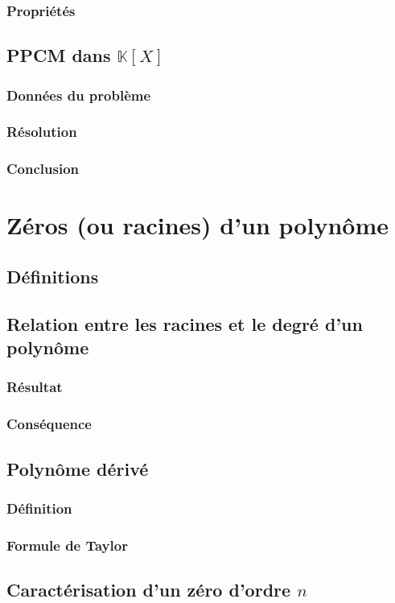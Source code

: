 \documentclass[12pt,a4paper,french]{book}
\begin{document}
			\subsubsection{Propriétés}
		\subsection{PPCM dans $\mathbb{K}[X]$}
			\subsubsection{Données du problème}
			\subsubsection{Résolution}
			\subsubsection{Conclusion}
	\section{Zéros (ou racines) d'un polynôme}
		\subsection{Définitions}
		\subsection{Relation entre les racines et le degré d'un polynôme}
			\subsubsection{Résultat}
			\subsubsection{Conséquence}
		\subsection{Polynôme dérivé}
			\subsubsection{Définition}
			\subsubsection{Formule de Taylor}
		\subsection{Caractérisation d'un zéro d'ordre $n$}
\end{document}
